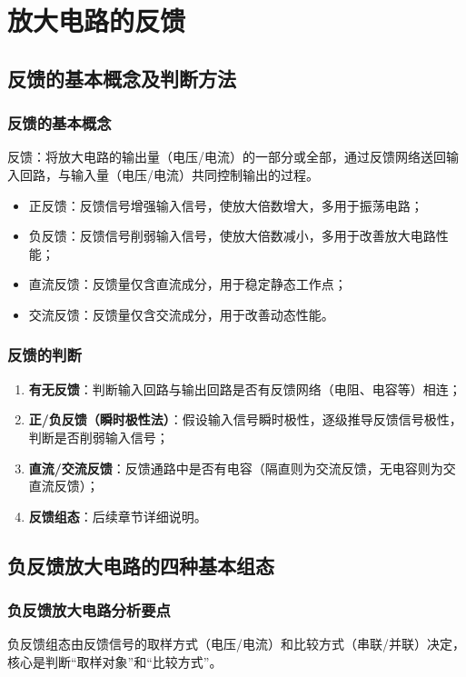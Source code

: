 \chapter{放大电路的反馈}

\section{反馈的基本概念及判断方法}
\subsection{反馈的基本概念}
反馈：将放大电路的输出量（电压/电流）的一部分或全部，通过反馈网络送回输入回路，与输入量（电压/电流）共同控制输出的过程。
\begin{itemize}
    \item 正反馈：反馈信号增强输入信号，使放大倍数增大，多用于振荡电路；
    \item 负反馈：反馈信号削弱输入信号，使放大倍数减小，多用于改善放大电路性能；
    \item 直流反馈：反馈量仅含直流成分，用于稳定静态工作点；
    \item 交流反馈：反馈量仅含交流成分，用于改善动态性能。
\end{itemize}

\subsection{反馈的判断}
\begin{enumerate}
    \item \textbf{有无反馈}：判断输入回路与输出回路是否有反馈网络（电阻、电容等）相连；
    \item \textbf{正/负反馈（瞬时极性法）}：假设输入信号瞬时极性，逐级推导反馈信号极性，判断是否削弱输入信号；
    \item \textbf{直流/交流反馈}：反馈通路中是否有电容（隔直则为交流反馈，无电容则为交直流反馈）；
    \item \textbf{反馈组态}：后续章节详细说明。
\end{enumerate}

\section{负反馈放大电路的四种基本组态}
\subsection{负反馈放大电路分析要点}
负反馈组态由反馈信号的取样方式（电压/电流）和比较方式（串联/并联）决定，核心是判断“取样对象”和“比较方式”。

